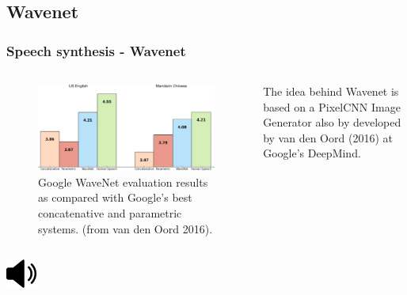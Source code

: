 \documentclass[a4paper,9pt]{beamer}
\theoremstyle{mytheoremstyle}
\begin{document}
\subsection{Wavenet}
\begin{frame}
\frametitle{Speech synthesis - Wavenet}
\begin{columns}
\begin{figure}
\begin{center}
  \includegraphics[width=\textwidth]{res/wavenet_evaluation.png}
\end{center}
	\caption{Google WaveNet evaluation results as compared with Google's best concatenative and parametric systems. (from van den Oord 2016).}
\end{figure}
\begin{exampleblock}{}
The idea behind Wavenet is based on a PixelCNN Image Generator also by developed by van den Oord (2016) at Google's DeepMind.
\end{exampleblock}
\end{columns}
\begin{center}
  \includegraphics[width=1cm]{res/speaker_icon.png}
\end{center}
\end{frame}
\end{document}
